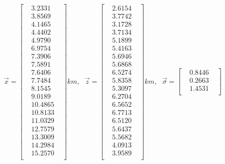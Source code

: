 \documentclass[12pt,runningheads]{article}
\begin{document}
\begin{align*}
\vec{x} = 
\begin{bmatrix}
& 3.2331 & \\
& 3.8569 & \\
& 4.1465 & \\
& 4.4402 & \\
& 4.9790 & \\
& 6.9754 & \\
& 7.3906 & \\
& 7.5891 & \\
& 7.6406 & \\
& 7.7484 & \\
& 8.1545 & \\
& 9.0189 & \\
& 10.4865 & \\
& 10.8133 & \\
& 11.0329 & \\
& 12.7579 & \\
& 13.3009 & \\
& 14.2984 & \\
& 15.2570 & \\
\end{bmatrix}km,\ \ \
\vec{z} =
\begin{bmatrix}
& 2.6154 & \\
& 3.7742 & \\
& 3.1728 & \\
& 3.7134 & \\
& 5.1899 & \\
& 5.4163 & \\
& 5.6946 & \\
& 5.6868 & \\
& 6.5274 & \\
& 5.8358 & \\
& 5.3097 & \\
& 6.2704 & \\
& 6.5652 & \\
& 6.7713 & \\
& 6.5120 & \\
& 5.6437 & \\
& 5.5682 & \\
& 4.0913 & \\
& 3.9589 & \\
\end{bmatrix}km,\ \ \
\vec{\sigma} =
\begin{bmatrix}
& 0.8446 & \\
& 0.2663 & \\
& 1.4531 & \\

\end{bmatrix}
\end{align*}
\end{document}
